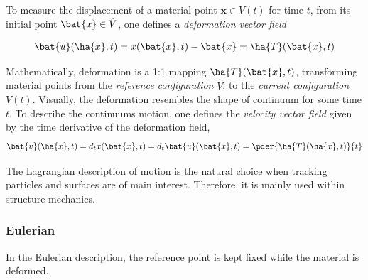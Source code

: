 To measure the displacement of a material point $\mathbf{x} \in V(t)$ for time $t$, from its initial point $\bat{x} \in \hat{V}$, one defines a \textit{deformation vector field} 

\begin{align}
\bat{u}(\ha{x},t) = x(\bat{x},t) - \bat{x} = \ha{T}(\bat{x}, t) 
\end{align}

Mathematically, deformation is a 1:1 mapping  $\ha{T}(\bat{x}, t)$, transforming material points from the   \textit{reference configuration} $\hat{V}$, to the  \textit{current configuration} $V(t)$. Visually, the deformation resembles the shape of continuum for some time $t$. To describe the continuums motion, one defines the \textit{velocity vector field} given by the time derivative of the deformation field,
\begin{align}
\bat{v}(\ha{x},t) = d_t x(\bat{x},t) = d_t \bat{u}(\bat{x},t) = \pder{\ha{T}(\ha{x}, t)}{t} 
\end{align}

The Lagrangian description of motion is the natural choice when tracking particles and surfaces are of main interest. Therefore, it is mainly used within structure mechanics. 

\subsubsection*{Eulerian}
 In the Eulerian description, the reference point is kept fixed while the material is deformed.






